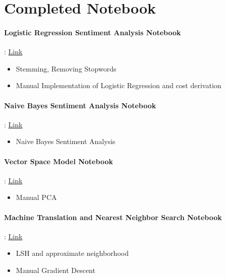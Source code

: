 \section{Completed Notebook}

\paragraph{Logistic Regression Sentiment Analysis Notebook}: 
\href{https://drive.google.com/file/d/1_7XX9QWWPlxo43Fw1xxx9PzFxpl27q2D/view?usp=sharing}{Link}
    \begin{itemize}
        \item Stemming, Removing Stopwords
        \item Manual Implementation of Logistic Regression and cost derivation 
    \end{itemize}
    
\paragraph{Naive Bayes Sentiment Analysis Notebook}: 
\href{https://drive.google.com/file/d/1G9ibr3t05UOVmuzRFZZQfG1HO_JkNy-M/view?usp=sharing}{Link}
    \begin{itemize}
        \item Naive Bayes Sentiment Analysis
    \end{itemize}


\paragraph{Vector Space Model Notebook}:
\href{https://drive.google.com/file/d/1BIm71QmfUo2MU9pw2CmmKQfKt1vwn-w6/view?usp=sharing}{Link}
    \begin{itemize}
        \item Manual PCA 
    \end{itemize}

\paragraph{Machine Translation and Nearest Neighbor Search Notebook}:
\href{https://drive.google.com/file/d/1ZQX4BSOBvFa3MQnUNnhGGRkQg2UoDc3S/view?usp=sharing}{Link}
    \begin{itemize}
        \item LSH and approximate neighborhood 
        \item Manual Gradient Descent 
    \end{itemize}